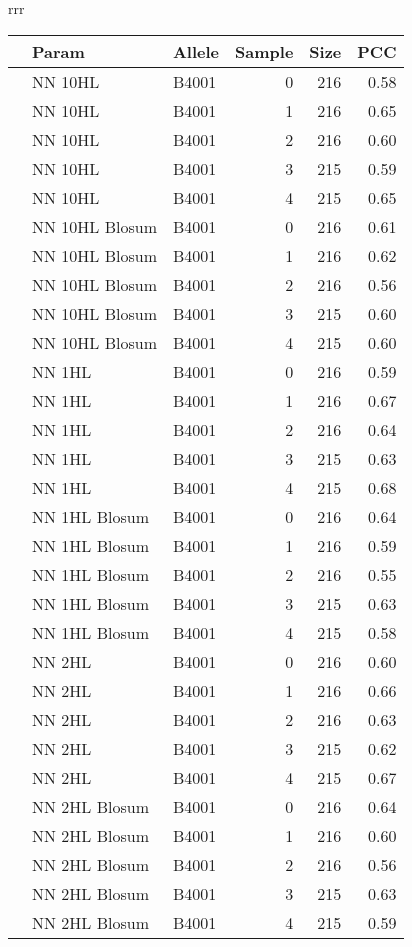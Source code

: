 \begin{table*}[hb]
\begin{center}
\begin{tabular}{rrr}
\begin{tabular}{rllrrr}
  \hline
 & Param & Allele & Sample & Size & PCC \\ 
  \hline
   & NN 10HL & B4001 &   0 & 216 & 0.58 \\ 
   & NN 10HL & B4001 &   1 & 216 & 0.65 \\ 
   & NN 10HL & B4001 &   2 & 216 & 0.60 \\ 
   & NN 10HL & B4001 &   3 & 215 & 0.59 \\ 
   & NN 10HL & B4001 &   4 & 215 & 0.65 \\ 
\hline
   & NN 10HL Blosum & B4001 &   0 & 216 & 0.61 \\ 
   & NN 10HL Blosum & B4001 &   1 & 216 & 0.62 \\ 
   & NN 10HL Blosum & B4001 &   2 & 216 & 0.56 \\ 
   & NN 10HL Blosum & B4001 &   3 & 215 & 0.60 \\ 
   & NN 10HL Blosum & B4001 &   4 & 215 & 0.60 \\ 
\hline
   & NN 1HL & B4001 &   0 & 216 & 0.59 \\ 
   & NN 1HL & B4001 &   1 & 216 & 0.67 \\ 
   & NN 1HL & B4001 &   2 & 216 & 0.64 \\ 
   & NN 1HL & B4001 &   3 & 215 & 0.63 \\ 
   & NN 1HL & B4001 &   4 & 215 & 0.68 \\ 
\hline
   & NN 1HL Blosum & B4001 &   0 & 216 & 0.64 \\ 
   & NN 1HL Blosum & B4001 &   1 & 216 & 0.59 \\ 
   & NN 1HL Blosum & B4001 &   2 & 216 & 0.55 \\ 
   & NN 1HL Blosum & B4001 &   3 & 215 & 0.63 \\ 
   & NN 1HL Blosum & B4001 &   4 & 215 & 0.58 \\ 
\hline
   & NN 2HL & B4001 &   0 & 216 & 0.60 \\ 
   & NN 2HL & B4001 &   1 & 216 & 0.66 \\ 
   & NN 2HL & B4001 &   2 & 216 & 0.63 \\ 
   & NN 2HL & B4001 &   3 & 215 & 0.62 \\ 
   & NN 2HL & B4001 &   4 & 215 & 0.67 \\ 
\hline
   & NN 2HL Blosum & B4001 &   0 & 216 & 0.64 \\ 
   & NN 2HL Blosum & B4001 &   1 & 216 & 0.60 \\ 
   & NN 2HL Blosum & B4001 &   2 & 216 & 0.56 \\ 
   & NN 2HL Blosum & B4001 &   3 & 215 & 0.63 \\ 
   & NN 2HL Blosum & B4001 &   4 & 215 & 0.59 \\ 
   \hline
\end{tabular}
\end{tabular}
\end{center}


\end{table*}
